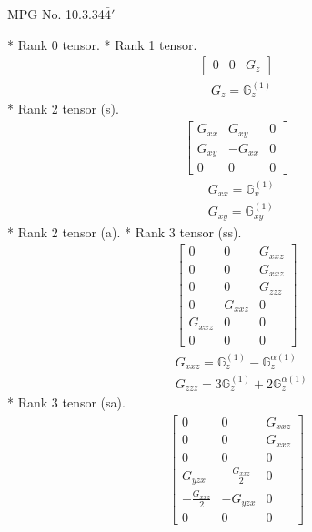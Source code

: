 \documentclass[fleqn,8pt,landscape]{jsarticle}
\begin{document}
\setcounter{MaxMatrixCols}{32}

\renewcommand{\tablename}{Table~}
\renewcommand{\figurename}{Figure~}
\begin{center}
\LARGE
MPG No. 10.3.34\quad$\bar{4}'$
\end{center}
* Rank 0 tensor.
* Rank 1 tensor.
\begin{align*}
\begin{bmatrix} 0 & 0 & G_{z} \end{bmatrix}
\end{align*}
\begin{align*}
& G_{z} = \mathbb{G}_{z}^{(1)}
\end{align*}
* Rank 2 tensor (s).
\begin{align*}
\begin{bmatrix} G_{xx} & G_{xy} & 0 \\ G_{xy} & - G_{xx} & 0 \\ 0 & 0 & 0 \end{bmatrix}
\end{align*}
\begin{align*}
& G_{xx} = \mathbb{G}_{v}^{(1)} \\
& G_{xy} = \mathbb{G}_{xy}^{(1)}
\end{align*}
* Rank 2 tensor (a).
* Rank 3 tensor (ss).
\begin{align*}
\begin{bmatrix} 0 & 0 & G_{xxz} \\ 0 & 0 & G_{xxz} \\ 0 & 0 & G_{zzz} \\ 0 & G_{xxz} & 0 \\ G_{xxz} & 0 & 0 \\ 0 & 0 & 0 \end{bmatrix}
\end{align*}
\begin{align*}
& G_{xxz} = \mathbb{G}_{z}^{(1)} - \mathbb{G}_{z}^{\alpha(1)} \\
& G_{zzz} = 3 \mathbb{G}_{z}^{(1)} + 2 \mathbb{G}_{z}^{\alpha(1)}
\end{align*}
* Rank 3 tensor (sa).
\begin{align*}
\begin{bmatrix} 0 & 0 & G_{xxz} \\ 0 & 0 & G_{xxz} \\ 0 & 0 & 0 \\ G_{yzx} & - \frac{G_{xxz}}{2} & 0 \\ - \frac{G_{xxz}}{2} & - G_{yzx} & 0 \\ 0 & 0 & 0 \end{bmatrix}
\end{align*}
\end{document}

